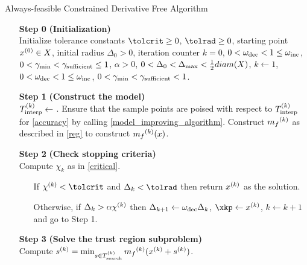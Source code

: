 

\begin{algorithm}[H]
    \caption{Always-feasible Constrained Derivative Free Algorithm}
    \label{constrained_dfo}
    \begin{itemize}
        \item[\textbf{Step 0}] \textbf{(Initialization)} \\
            Initialize tolerance constants 
            $\tolcrit \ge 0$,
            $\tolrad \ge 0$,
            starting point $x^{(0)} \in X$,
            initial radius $\Delta_0 > 0$,
            iteration counter $k=0$,
            $0 < \omega_{\text{dec}} < 1 \le \omega_{\text{inc}}$,
            $0 < \gamma_{\text{min}} < \gamma_{\text{sufficient}} \le 1$,
            $\alpha > 0$,
            $0 < \Delta_0 < \Delta_{\text{max}} < \frac 1 2 diam(X)$,
            $k \gets 1$,
            $0 < \omega_{\text{dec}} < 1 \le \omega_{\text{inc}}$,
            $0 < \gamma_{\text{min}} < \gamma_{\text{sufficient}} < 1$.
            
        \item[\textbf{Step 1}] \textbf{(Construct the model)} \\
            $ {T_{\text{interp}}^{(k)}} \gets $ .
            Ensure that the sample points are poised with respect to $ {T_{\text{interp}}^{(k)}} $ for \cref{accuracy} by calling \cref{model_improving_algorithm}.
            Construct ${{m}_f}^{(k)}$ as described in \cref{reg} to construct ${{m}_f}^{(k)}(x)$.
        
        \item[\textbf{Step 2}] \textbf{(Check stopping criteria)} \\
            Compute $\chi_k$ as in \cref{critical}. \begin{itemize}
                \item[] If $ \chik < \tolcrit $ and $\dk < \tolrad$ then return $ {x^{(k)}} $ as the solution.
                \item[] Otherwise, if $\Delta_k > \alpha {\chi^{(k)}}$ then 
                $\Delta_{k+1} \gets \omega_{\text{dec}} \Delta_k$, 
                $ \xkp \gets \iteratek$,
                $k \gets k+1$ and go to Step 1.
            \end{itemize}
        
        \item[\textbf{Step 3}] \textbf{(Solve the trust region subproblem)} \\
            Compute ${{s}^{(k)}} = \min_{s \in {T_{\text{search}}^{(k)}}} {{m}_f}^{(k)}({x}^{(k)} + {{s}^{(k)}})$.
            

\end{itemize}
\end{algorithm}
